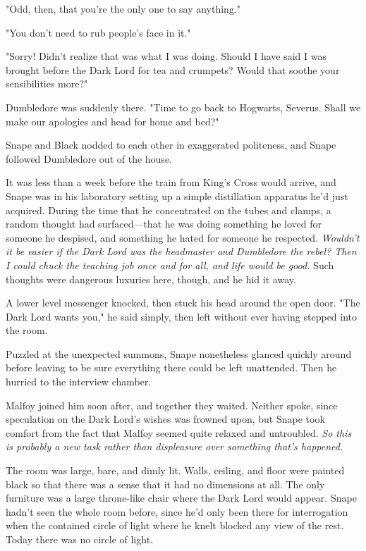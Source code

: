 "Odd, then, that you're the only one to say anything."

"You don't need to rub people's face in it."

"Sorry! Didn't realize that was what I was doing. Should I have said I was brought before the Dark Lord for tea and crumpets? Would that soothe your sensibilities more?"

Dumbledore was suddenly there. "Time to go back to Hogwarts, Severus. Shall we make our apologies and head for home and bed?"

Snape and Black nodded to each other in exaggerated politeness, and Snape followed Dumbledore out of the house.

\sbreak

It was less than a week before the train from King's Cross would arrive, and Snape was in his laboratory setting up a simple distillation apparatus he'd just acquired. During the time that he concentrated on the tubes and clamps, a random thought had surfaced—that he was doing something he loved for someone he despised, and something he hated for someone he respected. \emph{Wouldn't it be easier if the Dark Lord was the headmaster and Dumbledore the rebel? Then I could chuck the teaching job once and for all, and life would be good.} Such thoughts were dangerous luxuries here, though, and he hid it away.

A lower level messenger knocked, then stuck his head around the open door. "The Dark Lord wants you," he said simply, then left without ever having stepped into the room.

Puzzled at the unexpected summons, Snape nonetheless glanced quickly around before leaving to be sure everything there could be left unattended. Then he hurried to the interview chamber.

Malfoy joined him soon after, and together they waited. Neither spoke, since speculation on the Dark Lord's wishes was frowned upon, but Snape took comfort from the fact that Malfoy seemed quite relaxed and untroubled. \emph{So this is probably a new task rather than displeasure over something that's happened.}

The room was large, bare, and dimly lit. Walls, ceiling, and floor were painted black so that there was a sense that it had no dimensions at all. The only furniture was a large throne-like chair where the Dark Lord would appear. Snape hadn't seen the whole room before, since he'd only been there for interrogation when the contained circle of light where he knelt blocked any view of the rest. Today there was no circle of light.

